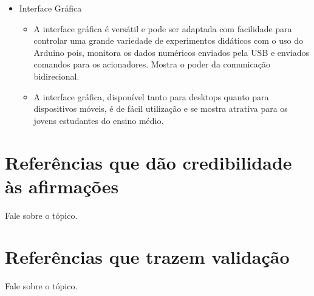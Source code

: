 \documentclass{article}
\begin{document}
\begin{itemize}
\begin{itemize}
		\end{itemize}	
	\item{Interface Gráfica}
	\begin{itemize}
		\item A interface gráfica é versátil e pode ser adaptada com facilidade para controlar uma grande variedade de experimentos didáticos com o uso do Arduino pois, monitora os dados numéricos enviados pela USB e enviados comandos para os acionadores. \cite{kit} Mostra o poder da comunicação bidirecional.
		\item A interface gráfica, disponível tanto para desktops quanto para dispositivos móveis, é de fácil utilização e se mostra atrativa para os jovens estudantes do ensino médio. \cite{kit}
	\end{itemize}
\end{itemize}

\section{Referências que dão credibilidade às afirmações}
Fale sobre o tópico.

\section{Referências que trazem validação}
Fale sobre o tópico.
\end{document}
